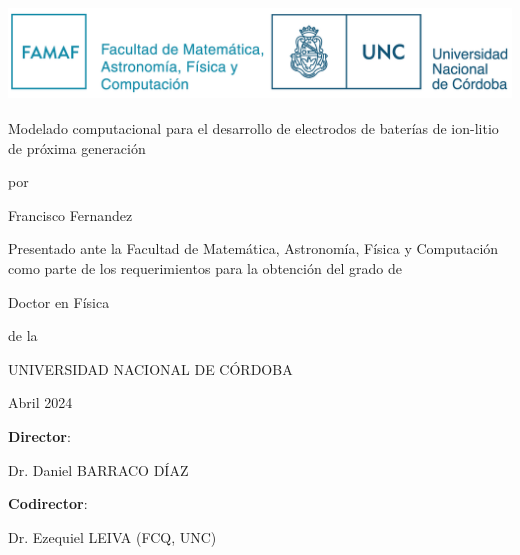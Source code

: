 \thispagestyle{empty}

\onehalfspacing

\begin{center}

    \includegraphics[height=2.5cm]{Caratula/logo.png}

    \vspace{1cm}

    {\LARGE Modelado computacional para el desarrollo de electrodos de baterías de ion-litio de próxima generación}

    \vspace{0.5cm}
    por
    \vspace{0.5cm}

    {\Large Francisco Fernandez}

    \vspace{0.5cm}

    Presentado ante la Facultad de Matemática, Astronomía, Física y Computación 
    como parte de los requerimientos para la obtención del grado de

    \vspace{0.5cm}

    {\Large Doctor en Física}

    \vspace{0.5cm}
    de la

    UNIVERSIDAD NACIONAL DE CÓRDOBA

    \vspace{0.5cm}

    Abril 2024

\end{center}

\vspace{0.5cm}

\textbf{Director}: 

\hspace{1.5cm} Dr. Daniel BARRACO DÍAZ

\textbf{Codirector}: 

\hspace{1.5cm} Dr. Ezequiel LEIVA (FCQ, UNC)

\vspace{0.25cm}

